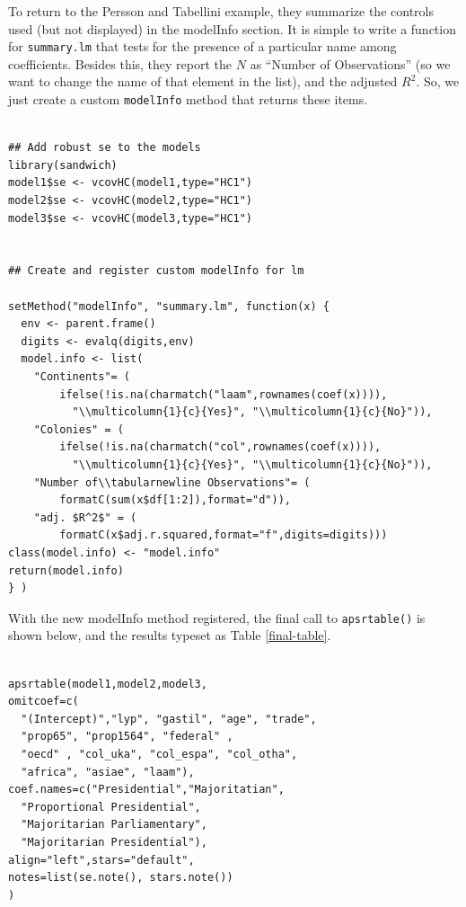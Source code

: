 \documentclass[10pt]{article} %
\begin{document}
To return to the Persson and Tabellini example, they summarize the controls used (but not displayed) in the modelInfo section. It is simple to write a function for \verb|summary.lm| that tests for the presence of a particular name among coefficients. Besides this, they report the $N$ as ``Number of Observations'' (so we want to change the name of that element in the list), and the adjusted $R^2$. So, we just create a custom \verb|modelInfo| method that returns these items.
\begin{verbatim}

## Add robust se to the models
library(sandwich)
model1$se <- vcovHC(model1,type="HC1")
model2$se <- vcovHC(model2,type="HC1")
model3$se <- vcovHC(model3,type="HC1")


## Create and register custom modelInfo for lm

setMethod("modelInfo", "summary.lm", function(x) {
  env <- parent.frame()
  digits <- evalq(digits,env)
  model.info <- list(
    "Continents"= (
        ifelse(!is.na(charmatch("laam",rownames(coef(x)))),
          "\\multicolumn{1}{c}{Yes}", "\\multicolumn{1}{c}{No}")),
    "Colonies" = (
        ifelse(!is.na(charmatch("col",rownames(coef(x)))),
          "\\multicolumn{1}{c}{Yes}", "\\multicolumn{1}{c}{No}")),
    "Number of\\tabularnewline Observations"= (
        formatC(sum(x$df[1:2]),format="d")),
    "adj. $R^2$" = (
        formatC(x$adj.r.squared,format="f",digits=digits)))
class(model.info) <- "model.info"
return(model.info)
} )

\end{verbatim}

With the new modelInfo method registered, the final call to \verb|apsrtable()| is shown below, and the results typeset as Table \ref{final-table}. 
\begin{verbatim}

apsrtable(model1,model2,model3,
omitcoef=c(
  "(Intercept)","lyp", "gastil", "age", "trade", 
  "prop65", "prop1564", "federal" ,
  "oecd" , "col_uka", "col_espa", "col_otha",
  "africa", "asiae", "laam"),
coef.names=c("Presidential","Majoritatian",
  "Proportional Presidential",
  "Majoritarian Parliamentary",
  "Majoritarian Presidential"),
align="left",stars="default",
notes=list(se.note(), stars.note())
)
\end{verbatim}
\end{document}

